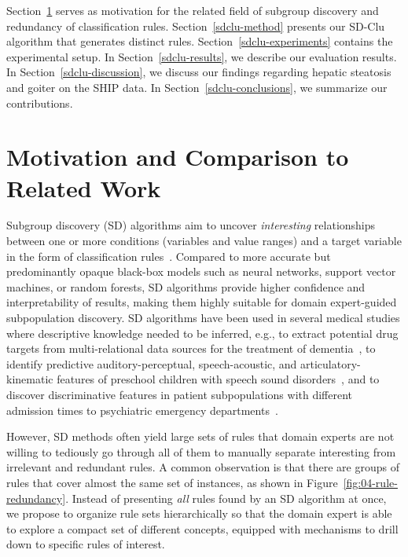 \documentclass[
  oneside]{book}
\begin{document}
Section~\ref{sdclu-intro} serves as motivation for the related field of subgroup discovery and redundancy of classification rules.
Section~\ref{sdclu-method} presents our SD-Clu algorithm that generates distinct rules.
Section~\ref{sdclu-experiments} contains the experimental setup.
In Section~\ref{sdclu-results}, we describe our evaluation results.
In Section~\ref{sdclu-discussion}, we discuss our findings regarding hepatic steatosis and goiter on the SHIP data.
In Section~\ref{sdclu-conclusions}, we summarize our contributions.

\hypertarget{sdclu-intro}{%
\section{Motivation and Comparison to Related Work}\label{sdclu-intro}}

Subgroup discovery (SD) algorithms aim to uncover \emph{interesting} relationships between one or more conditions (variables and value ranges) and a target variable in the form of classification rules~\autocite{Herrera11,Atzmueller15}.
Compared to more accurate but predominantly opaque black-box models such as neural networks, support vector machines, or random forests, SD algorithms provide higher confidence and interpretability of results, making them highly suitable for domain expert-guided subpopulation discovery.
SD algorithms have been used in several medical studies where descriptive knowledge needed to be inferred, e.g., to extract potential drug targets from multi-relational data sources for the treatment of dementia~\autocite{Nguyen:Nature15}, to identify predictive auditory-perceptual, speech-acoustic, and articulatory-kinematic features of preschool children with speech sound disorders~\autocite{Vick14}, and to discover discriminative features in patient subpopulations with different admission times to psychiatric emergency departments~\autocite{Carmona11}.

However, SD methods often yield large sets of rules that domain experts are not willing to tediously go through all of them to manually separate interesting from irrelevant and redundant rules.
A common observation is that there are groups of rules that cover almost the same set of instances, as shown in Figure~\ref{fig:04-rule-redundancy}.
Instead of presenting \emph{all} rules found by an SD algorithm at once, we propose to organize rule sets hierarchically so that the domain expert is able to explore a compact set of different concepts, equipped with mechanisms to drill down to specific rules of interest.
\end{document}
